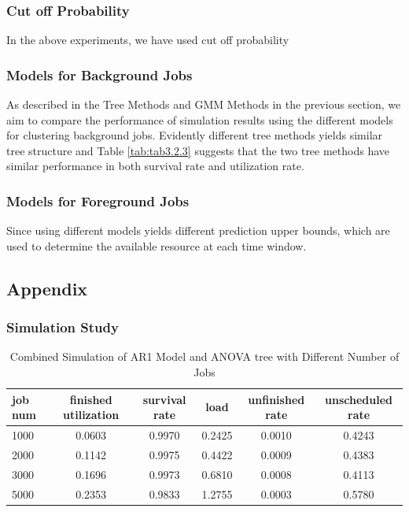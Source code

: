 \documentclass{article}
\begin{document}
\subsubsection{Cut off Probability}

\begin{flushleft}
In the above experiments, we have used cut off probability 
\end{flushleft}

\subsubsection{Models for Background Jobs}

\begin{flushleft}
As described in the Tree Methods and GMM Methods in the previous section, we aim
to compare the performance of simulation results using the different models for
clustering background jobs. Evidently different tree methods yields similar tree
structure and Table \ref{tab:tab3.2.3} suggests that the two tree methods have
similar performance in both survival rate and utilization rate.
\end{flushleft}

\subsubsection{Models for Foreground Jobs}
Since using different models yields different prediction upper bounds, which are
used to determine the available resource at each time window.

\subsection{Appendix}

\subsubsection{Simulation Study}

\begin{longtable}[htbp]{l|*{5}{c}} 
  \caption{Combined Simulation of AR1 Model and ANOVA tree with Different Number of Jobs}
  \label{tab:tab3.2.1} \\
  \textbf{job num} & \textbf{finished utilization} & \textbf{survival rate} &
  \textbf{load} & \textbf{unfinished rate} & \textbf{unscheduled rate} \\
  \hline
  1000 & 0.0603 & 0.9970 & 0.2425 & 0.0010 & 0.4243\\
  2000 & 0.1142 & 0.9975 & 0.4422 & 0.0009 & 0.4383\\
  3000 & 0.1696 & 0.9973 & 0.6810 & 0.0008 & 0.4113\\
  5000 & 0.2353 & 0.9833 & 1.2755 & 0.0003 & 0.5780\\
\end{longtable}
\end{document}
